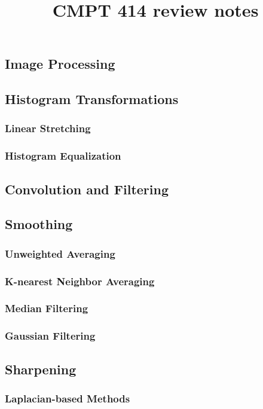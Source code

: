 \documentclass{article}
\title{CMPT 414 review notes}
\author{}
\date{}
\begin{document}
\maketitle

\begin{multicols}{2}

\section{Image Processing}
\subsection{Histogram Transformations}
\subsubsection{Linear Stretching}
\subsubsection{Histogram Equalization}
\subsection{Convolution and Filtering}
\subsection{Smoothing}
\subsubsection{Unweighted Averaging}
\subsubsection{K-nearest Neighbor Averaging}
\subsubsection{Median Filtering}
\subsubsection{Gaussian Filtering}
\subsection{Sharpening}
\subsubsection{Laplacian-based Methods}

\end{multicols}
\end{document}
